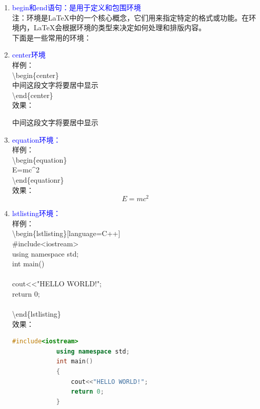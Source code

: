 \documentclass[12pt,a4paper,UTF8]{article}
\begin{document}
\begin{enumerate}
        
        \item \textcolor{blue}{begin和end语句：是用于定义和包围环境}\\[8pt]
        注：环境是LaTeX中的一个核心概念，它们用来指定特定的格式或功能。在环境内，LaTeX会根据环境的类型来决定如何处理和排版内容。\\
        下面是一些常用的环境：

        \item \textcolor{blue}{center环境}\\
        样例：\\
        \textbackslash begin\{center\}\\
        中间这段文字将要居中显示\\
        \textbackslash end\{center\}\\
        效果：\\
        \begin{center}
            中间这段文字将要居中显示
        \end{center}
        \bigskip
        
        \item \textcolor{blue}{equation环境：}\\
        样例：\\
        \textbackslash begin\{equation\}\\
        E=mc\textasciicircum2\\
        \textbackslash end\{equationr\}\\
        效果：\\
        \begin{equation}
            E=mc^2
        \end{equation}
        \bigskip

        \item \textcolor{blue}{lstlisting环境：}\\
        样例：\\
        \textbackslash begin\{lstlisting\}[language=C++]\\
        \#include<iostream>\\
        using namespace std;\\
        int main()\\
        {\\
            cout<<"HELLO WORLD!";\\
            return 0;\\
        }\\
        \textbackslash end\{lstlisting\}\\
        效果：\\
        \begin{lstlisting}[language=C++]
            #include<iostream>
            using namespace std;
            int main()
            {
                cout<<"HELLO WORLD!";
                return 0;
            }
        \end{lstlisting}
        \bigskip
        

\end{enumerate}
\end{document}
